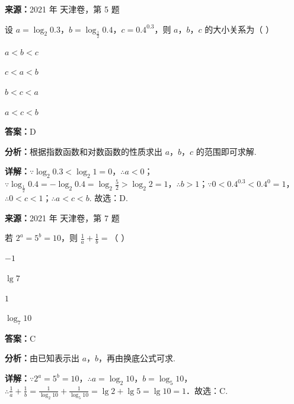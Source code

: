 \begin{question}[points=5]
\textbf{来源：}2021 年 天津卷，第 5 题\par
设 $a = \log_2 0.3$，$b = \log_{\frac{1}{2}} 0.4$，$c = 0.4^{0.3}$，则 $a$，$b$，$c$ 的大小关系为（   ）
\begin{choices}
  \item $a < b < c$
  \item $c < a < b$
  \item $b < c < a$
  \item $a < c < b$
\end{choices}
\begin{solution}
\textbf{答案：}D

\textbf{分析：}根据指数函数和对数函数的性质求出 $a$，$b$，$c$ 的范围即可求解.

\textbf{详解：}$\because \log_2 0.3 < \log_2 1 = 0$，$\therefore a < 0$；$\because \log_{\frac{1}{2}} 0.4 = -\log_2 0.4 = \log_2 \frac{5}{2} > \log_2 2 = 1$，$\therefore b > 1$；$\because 0 < 0.4^{0.3} < 0.4^0 = 1$，$\therefore 0 < c < 1$；$\therefore a < c < b$. 故选：D.
\end{solution}
\end{question}

\begin{question}[points=5]
\textbf{来源：}2021 年 天津卷，第 7 题\par
若 $2^a = 5^b = 10$，则 $\frac{1}{a} + \frac{1}{b} =$（   ）
\begin{choices}
  \item $-1$
  \item $\lg 7$
  \item $1$
  \item $\log_{7} 10$
\end{choices}
\begin{solution}
\textbf{答案：}C

\textbf{分析：}由已知表示出 $a$，$b$，再由换底公式可求.

\textbf{详解：}$\because 2^a = 5^b = 10$，$\therefore a = \log_2 10$，$b = \log_5 10$，$\therefore \frac{1}{a} + \frac{1}{b} = \frac{1}{\log_2 10} + \frac{1}{\log_5 10} = \lg 2 + \lg 5 = \lg 10 = 1$．故选：C.
\end{solution}
\end{question}

